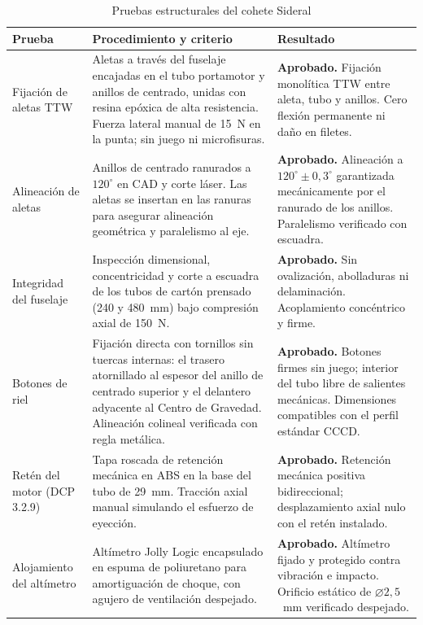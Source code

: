 \begin{table}[htbp]
\centering
\caption{Pruebas estructurales del cohete Sideral}
\label{tab:pruebas_estructurales}
\begin{tabularx}{\textwidth}{lXX}
\hline
\textbf{Prueba} & \textbf{Procedimiento y criterio} & \textbf{Resultado} \\ \hline
Fijación de aletas TTW & 
Aletas a través del fuselaje encajadas en el tubo portamotor y anillos de centrado, unidas con resina epóxica de alta resistencia. Fuerza lateral manual de 15~N en la punta; sin juego ni microfisuras. & 
\textbf{Aprobado.} Fijación monolítica TTW entre aleta, tubo y anillos. Cero flexión permanente ni daño en filetes. \\ \hline
Alineación de aletas & 
Anillos de centrado ranurados a $120^\circ$ en CAD y corte láser. Las aletas se insertan en las ranuras para asegurar alineación geométrica y paralelismo al eje. & 
\textbf{Aprobado.} Alineación a $120^\circ \pm 0,3^\circ$ garantizada mecánicamente por el ranurado de los anillos. Paralelismo verificado con escuadra. \\ \hline
Integridad del fuselaje & 
Inspección dimensional, concentricidad y corte a escuadra de los tubos de cartón prensado (240 y 480~mm) bajo compresión axial de 150~N. & 
\textbf{Aprobado.} Sin ovalización, abolladuras ni delaminación. Acoplamiento concéntrico y firme. \\ \hline
Botones de riel & 
Fijación directa con tornillos sin tuercas internas: el trasero atornillado al espesor del anillo de centrado superior y el delantero adyacente al Centro de Gravedad. Alineación colineal verificada con regla metálica. & 
\textbf{Aprobado.} Botones firmes sin juego; interior del tubo libre de salientes mecánicas. Dimensiones compatibles con el perfil estándar CCCD. \\ \hline
Retén del motor (DCP 3.2.9) & 
Tapa roscada de retención mecánica en ABS en la base del tubo de 29~mm. Tracción axial manual simulando el esfuerzo de eyección. & 
\textbf{Aprobado.} Retención mecánica positiva bidireccional; desplazamiento axial nulo con el retén instalado. \\ \hline
Alojamiento del altímetro & 
Altímetro Jolly Logic encapsulado en espuma de poliuretano para amortiguación de choque, con agujero de ventilación despejado. & 
\textbf{Aprobado.} Altímetro fijado y protegido contra vibración e impacto. Orificio estático de $\varnothing 2,5$~mm verificado despejado. \\ \hline
\end{tabularx}
\end{table}


